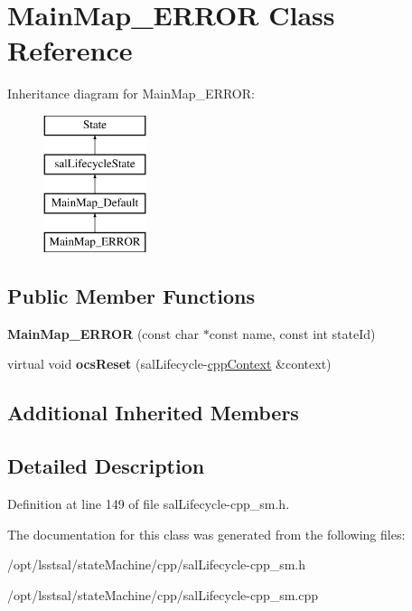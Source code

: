 \hypertarget{class_main_map___e_r_r_o_r}{\section{Main\-Map\-\_\-\-E\-R\-R\-O\-R Class Reference}
\label{class_main_map___e_r_r_o_r}
}
Inheritance diagram for Main\-Map\-\_\-\-E\-R\-R\-O\-R\-:\begin{figure}[H]
\begin{center}
\leavevmode
\includegraphics[height=4.000000cm]{class_main_map___e_r_r_o_r}
\end{center}
\end{figure}
\subsection*{Public Member Functions}
\begin{DoxyCompactItemize}
\item 
\hypertarget{class_main_map___e_r_r_o_r_ae06ea6dbe1d8f12eb91736baea016059}{{\bfseries Main\-Map\-\_\-\-E\-R\-R\-O\-R} (const char $\ast$const name, const int state\-Id)}\label{class_main_map___e_r_r_o_r_ae06ea6dbe1d8f12eb91736baea016059}

\item 
\hypertarget{class_main_map___e_r_r_o_r_ae6def65b95ff514701b13cd24eefa8d3}{virtual void {\bfseries ocs\-Reset} (sal\-Lifecycle-\/\hyperlink{classcpp_context}{cpp\-Context} \&context)}\label{class_main_map___e_r_r_o_r_ae6def65b95ff514701b13cd24eefa8d3}

\end{DoxyCompactItemize}
\subsection*{Additional Inherited Members}


\subsection{Detailed Description}


Definition at line 149 of file sal\-Lifecycle-\/cpp\-\_\-sm.\-h.



The documentation for this class was generated from the following files\-:\begin{DoxyCompactItemize}
\item 
/opt/lsstsal/state\-Machine/cpp/sal\-Lifecycle-\/cpp\-\_\-sm.\-h\item 
/opt/lsstsal/state\-Machine/cpp/sal\-Lifecycle-\/cpp\-\_\-sm.\-cpp\end{DoxyCompactItemize}
